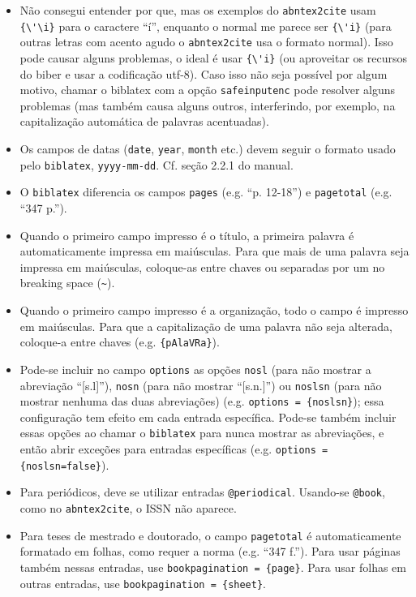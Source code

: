 \documentclass[a4paper]{article}
\begin{document}
\begin{itemize}
    \item Não consegui entender por que, mas os exemplos do \verb`abntex2cite` usam \verb`{\'\i}` para o caractere ``í'', enquanto o normal me parece ser \verb`{\'i}` (para outras letras com acento agudo o \verb`abntex2cite` usa o formato normal). Isso pode causar alguns problemas, o ideal é usar \verb`{\'i}` (ou aproveitar os recursos do biber e usar a codificação utf-8). Caso isso não seja possível por algum motivo, chamar o biblatex com a opção \verb`safeinputenc` pode resolver alguns problemas (mas também causa alguns outros, interferindo, por exemplo, na capitalização automática de palavras acentuadas).
    \item Os campos de datas (\verb`date`, \verb`year`, \verb`month` etc.) devem seguir o formato usado pelo \verb`biblatex`, \verb`yyyy-mm-dd`. Cf. seção 2.2.1 do manual.
    \item O \verb`biblatex` diferencia os campos \verb`pages` (e.g. ``p. 12-18'') e \verb`pagetotal` (e.g. ``347 p.'').
    \item Quando o primeiro campo impresso é o título, a primeira palavra é automaticamente impressa em maiúsculas. Para que mais de uma palavra seja impressa em maiúsculas, coloque-as entre chaves ou separadas por um no breaking space (\verb`~`).
    \item Quando o primeiro campo impresso é a organização, todo o campo é impresso em maiúsculas. Para que a capitalização de uma palavra não seja alterada, coloque-a entre chaves (e.g. \verb`{pAlaVRa}`).
    \item Pode-se incluir no campo \verb`options` as opções \verb`nosl` (para não mostrar a abreviação ``[s.l]''), \verb`nosn` (para não mostrar ``[s.n.]'') ou \verb`noslsn` (para não mostrar nenhuma das duas abreviações) (e.g. \verb`options = {noslsn}`); essa configuração tem efeito em cada entrada específica. Pode-se também incluir essas opções ao chamar o \verb`biblatex` para nunca mostrar as abreviações, e então abrir exceções para entradas específicas (e.g. \verb`options = {noslsn=false}`).
    \item Para periódicos, deve se utilizar entradas \verb`@periodical`. Usando-se \verb`@book`, como no \verb`abntex2cite`, o ISSN não aparece.
    \item Para teses de mestrado e doutorado, o campo \verb`pagetotal` é automaticamente formatado em folhas, como requer a norma (e.g. ``347 f.''). Para usar páginas também nessas entradas, use \verb`bookpagination = {page}`. Para usar folhas em outras entradas, use \verb`bookpagination = {sheet}`.

\end{itemize}
\end{document}
